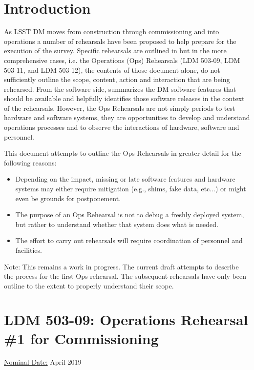 
\section{Introduction}

As LSST DM moves from construction through commissioning and into operations 
a number of rehearsals have been proposed to help prepare for the execution 
of the survey.  Specific rehearsals are outlined in  but in 
the more comprehensive cases, i.e. the Operations (Ops) Rehearsals (LDM 503-09, LDM 503-11, and 
LDM 503-12), the contents of those document alone, do not sufficiently outline 
the scope, content, action and interaction that are being rehearsed.  
From the software side, 
summarizes the DM software features that should be available and helpfully 
identifies those software releases in the context of the rehearsals.  
However, the Ops Rehearsals are not simply periods to test hardware and 
software systems, they are opportunities to develop and understand operations 
processes and to observe the interactions of hardware, software and personnel.

This document attempts to outline the Ops Rehearsals in greater detail for the following reasons:
\begin{itemize}
\item Depending on the impact, missing or late software features and hardware systems may either
require mitigation (e.g., shims, fake data, etc...) or might even be grounds for 
postponement.
\item The purpose of an Ops Rehearsal is not to debug 
a freshly deployed system, but rather to understand whether that system does
what is needed.
\item The effort to carry out rehearsals will 
require coordination of personnel and facilities.
\end{itemize}

Note: This remains a work in progress.  The current draft attempts to describe the 
process for the first Ops rehearsal.  The subsequent rehearsals have only been 
outline to the extent to properly understand their scope.

\clearpage

\section{LDM 503-09: Operations Rehearsal \#1 for Commissioning}

\underline{Nominal Date:} April 2019

